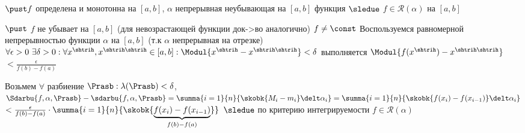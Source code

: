 \begin{proofs}
	$\pust f$ определена и монотонна на $[a,b]$, $\alpha$ непрерывная неубывающая на $[a,b]$ функция $\sledue$ $f \in \mathcal{R}(\alpha)$ на $[a,b]$
	\begin{dokvo}
		$\pust$ $f$ не убывает на $[a,b]$ (для невозрастающей функции док->во аналогично) $f \neq \const$ Воспользуемся равномерной непрерывностью функции $\alpha$ на $[a,b]$ (т.к $\alpha$ непрерывная на отрезке)
		$\forall \epsilon > 0 \ \exists \delta > 0 : \forall x^{\shtrih}, x^{\shtrih\shtrih} \in [a,b]: \Modul{x^{\shtrih} - x^{\shtrih\shtrih}} < \delta$
		выполняется $\Modul{f(x^{\shtrih}) - x^{\shtrih\shtrih}}$ $< \frac{\epsilon}{f(b)-f(a)}$

		Возьмем $\forall$ разбиение $\Prasb: \lambda(\Prasb) < \delta$, $\Sdarbu{f,\alpha,\Prasb} - \sdarbu{f,\alpha, \Prasb} = \summa{i=1}{n}{\skobk{M_i - m_i}\delt \alpha_i} = \summa{i=1}{n}{\skobk{f(x_i) - f(x_{i-1})}\delt \alpha_i} $ $< \frac{\epsilon}{f(b) -f(a)} \cdot \summa{i=1}{n}{\skobk{\underbrace{f(x_i) - f(x_{i-1})}_{f(b) - f(a)}}}$
		$\sledue$ по критерию интегрируемости $f \in \mathcal{R}(\alpha)$
	\end{dokvo}
\end{proofs}
